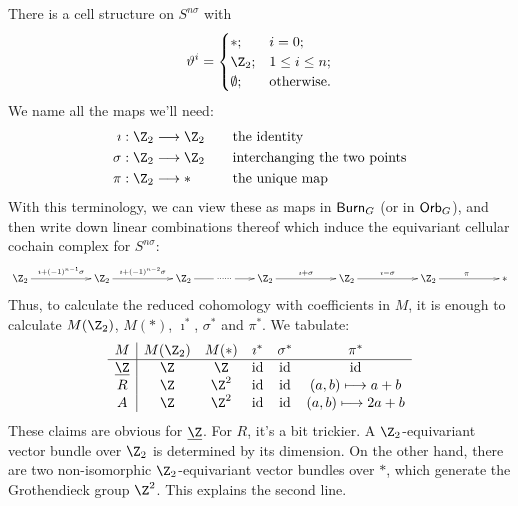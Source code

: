 \documentclass[11pt]{article}
\begin{document}
There is a cell structure on $S^{n\sigma}$ with
\[\vartheta^i=\begin{cases} *;&i=0;\\\Z_2;&1\leq i\leq n;\\\emptyset;&\text{otherwise}.\end{cases}\]
We name all the maps we'll need:
\begin{alignat*}{2}
\imath&:\Z_2\to\Z_2&\quad&\text{the identity}\\
\sigma&:\Z_2\to\Z_2&\quad&\text{interchanging the two points}\\
\pi&:\Z_2\to *&\quad&\text{the unique map}
\end{alignat*}
With this terminology, we can view these as maps in $\operatorname{{\mathsf{Burn}}}_G$ (or in $\operatorname{{\mathsf{Orb}}}_G$), and then write down linear combinations thereof which induce the equivariant cellular cochain complex for $S^{n\sigma}$:
\[\xymatrix@C=2cm{
\Z_2\ar[r]^{\imath+(-1)^{n-1}\sigma}&
\Z_2\ar[r]^{\imath+(-1)^{n-2}\sigma}&
\Z_2\ar[r]|{\ \cdots\cdots\ }&
\Z_2\ar[r]^{\imath+\sigma}&
\Z_2\ar[r]^{\imath-\sigma}&
\Z_2\ar[r]^\pi&\ast
}\]
Thus, to calculate the reduced cohomology with coefficients in $M$, it is enough to calculate $M(\Z_2)$, $M(*)$, $\imath^*$, $\sigma^*$ and $\pi^*$. We tabulate:
\[\begin{array}{c|ccccc}
M&M(\Z_2)&M(*)&\imath^*&\sigma^*&\pi^*\\\hline
\underline\Z&\Z&\Z&\id&\id&\id\\
R&\Z&\Z^2&\id&\id&(a,b)\shortmapsto a+b\\
A&\Z&\Z^2&\id&\id&(a,b)\shortmapsto 2a+b
\end{array}\]
These claims are obvious for $\underline\Z$. For $R$, it's a bit trickier. A $\Z_2$-equivariant vector bundle over $\Z_2$ is determined by its dimension. On the other hand, there are two non-isomorphic $\Z_2$-equivariant vector bundles over $*$, which generate the Grothendieck group $\Z^2$. This explains the second line.
\end{document}
